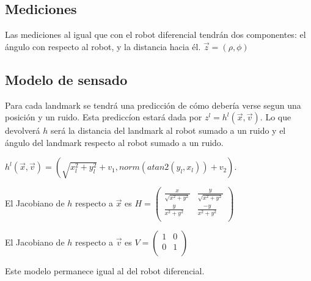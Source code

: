 \documentclass[a4paper]{article}
\theoremstyle{plain}
\theoremstyle{remark}
\theoremstyle{definition}
\begin{document}
\subsection*{Mediciones}

Las mediciones al igual que con el robot diferencial tendrán dos componentes: el ángulo con respecto al robot, y la distancia hacia él. $\vec{z} = (\rho, \phi)$

\subsection*{Modelo de sensado}

Para cada landmark se tendrá una predicción de cómo debería verse segun una posición y un ruido. Esta prediccíon estará dada por $z^l = h^l(\vec{x}, \vec{v})$. Lo que devolverá $h$ será la distancia del landmark al robot sumado a un ruido y el ángulo del landmark respecto al robot sumado a un ruido.

$h^l(\vec{x}, \vec{v}) = (\sqrt{x_l^2 + y_l^2} + v_1, norm(atan2(y_l, x_l)) + v_2)$.

El Jacobiano de $h$ respecto a $\vec{x}$ es $H = \left(
\begin{matrix}
\frac{x}{\sqrt{x^2 + y^2}} & \frac{y}{\sqrt{x^2 + y^2}} \\
\frac{y}{x^2 + y^2} & \frac{-y}{x^2 + y^2} \\
\end{matrix}
\right)$

El Jacobiano de $h$ respecto a $\vec{v}$ es $V = \left(
\begin{matrix}
1 & 0 \\
0 & 1 \\
\end{matrix}
\right)$

Este modelo permanece igual al del robot diferencial.
\end{document}
